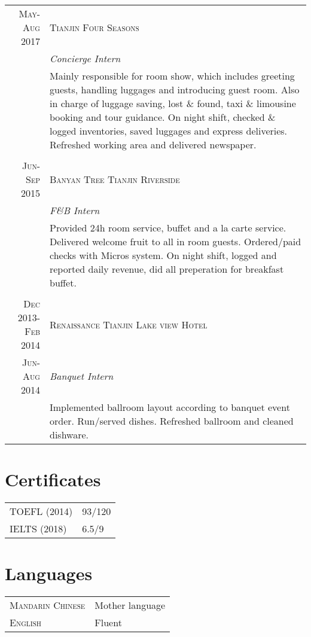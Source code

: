 \documentclass[12pt,a4paper]{article}
\begin{document}
\noindent\begin{tabular}{r|p{9.5cm}}

\textsc{May-Aug 2017} 
	& \textsc{Tianjin Four Seasons}\\
	&\emph{Concierge Intern}\\

	&Mainly responsible for room show, which includes 
	greeting guests, handling luggages and introducing guest room. 
	Also in charge of luggage saving, lost \& found, 
	taxi \& limousine booking and tour guidance. 
	On night shift, checked \& logged inventories, 
	saved luggages and express deliveries. 
	Refreshed working area and delivered newspaper.\\
\multicolumn{2}{c}{} \\


\textsc{Jun-Sep 2015} 
	& \textsc{Banyan Tree Tianjin Riverside}\\
	&\emph{F\&B Intern}\\
	
	&Provided 24h room service, 
	buffet and a la carte service. 
	Delivered welcome fruit to all in room guests. 
	Ordered/paid checks with Micros system. 
	On night shift,	logged and reported daily revenue, 
	did all preperation for breakfast buffet.\\
\multicolumn{2}{c}{} \\

\textsc{Dec 2013-Feb 2014} 
	& \textsc{Renaissance Tianjin Lake view Hotel}\\
\textsc{Jun-Aug 2014} 
	& \emph{Banquet Intern}\\
	& Implemented ballroom layout according to banquet event order. 
	Run/served dishes.
	Refreshed ballroom and cleaned dishware.\\

\end{tabular}

\section{Certificates}

\noindent\begin{tabular}{p{7cm} l}
	TOEFL (2014) & 93/120\\
	IELTS (2018) & 6.5/9\\
\end{tabular}

\section{Languages}
	\noindent\begin{tabular}{p{7cm} l}
	\textsc{Mandarin Chinese} & Mother language\\
	\textsc{English} & Fluent\\
\end{tabular}
\end{document}
